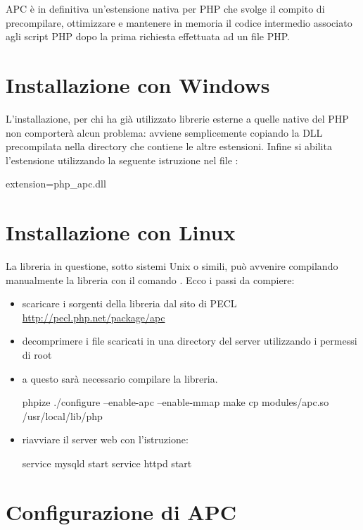 \ac{APC} è in definitiva un'estensione nativa per PHP che svolge il compito di precompilare, ottimizzare e mantenere in memoria il codice intermedio associato agli script PHP dopo la prima richiesta effettuata ad un file PHP.

\section*{Installazione con Windows}
L'installazione, per chi ha già utilizzato librerie esterne a quelle native del PHP non comporterà alcun problema: avviene semplicemente copiando la DLL precompilata nella directory che contiene le altre estensioni. Infine si abilita l'estensione utilizzando la seguente istruzione nel file :

\begin{code}
extension=php_apc.dll
\end{code}

\section*{Installazione con Linux}
La libreria in questione, sotto sistemi Unix o simili, può avvenire compilando manualmente la libreria con il comando . Ecco i passi da compiere:

\begin{itemize}
\item scaricare i sorgenti della libreria dal sito di PECL \url{http://pecl.php.net/package/apc}
\item decomprimere i file scaricati in una directory del server utilizzando i permessi di root
\item a questo sarà necessario compilare la libreria.
\begin{code}
phpize
./configure --enable-apc --enable-mmap
make
cp modules/apc.so /usr/local/lib/php
\end{code}
\item riavviare il server web con l'istruzione:
\begin{code}
service mysqld start
service httpd start
\end{code}
\end{itemize}

\section*{Configurazione di APC}

